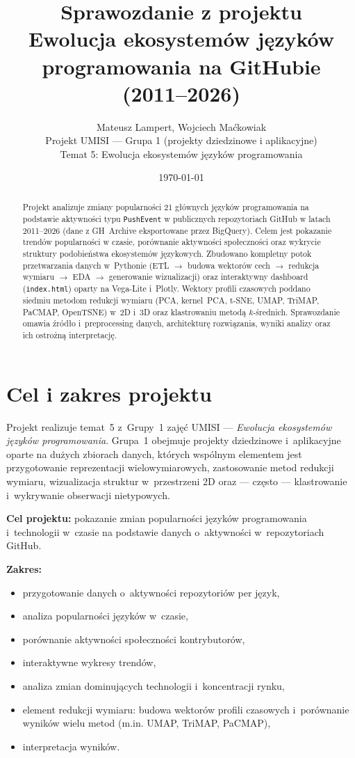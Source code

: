 \documentclass[11pt,a4paper]{article}
\title{\textbf{Sprawozdanie z projektu}\\[0.4em]
\large Ewolucja ekosystemów języków programowania na GitHubie (2011--2026)}
\author{Mateusz Lampert, Wojciech Maćkowiak\\[0.4em]
Projekt UMISI --- Grupa 1 (projekty dziedzinowe i aplikacyjne)\\
Temat 5: Ewolucja ekosystemów języków programowania}
\date{\today}
\begin{document}
\maketitle

\begin{abstract}
\noindent
Projekt analizuje zmiany popularności 21 głównych języków programowania na podstawie
aktywności typu \texttt{PushEvent} w publicznych repozytoriach GitHub w latach
2011--2026 (dane z GH~Archive eksportowane przez BigQuery). Celem jest pokazanie
trendów popularności w czasie, porównanie aktywności społeczności oraz wykrycie
struktury podobieństwa ekosystemów językowych. Zbudowano kompletny potok przetwarzania
danych w~Pythonie (ETL $\rightarrow$ budowa wektorów cech $\rightarrow$ redukcja wymiaru
$\rightarrow$ EDA $\rightarrow$ generowanie wizualizacji) oraz interaktywny dashboard
(\texttt{index.html}) oparty na Vega-Lite i~Plotly. Wektory profili czasowych poddano
siedmiu metodom redukcji wymiaru (PCA, kernel~PCA, t-SNE, UMAP, TriMAP, PaCMAP, OpenTSNE)
w~2D i~3D oraz klastrowaniu metodą $k$-średnich. Sprawozdanie omawia źródło i~preprocessing
danych, architekturę rozwiązania, wyniki analizy oraz ich ostrożną interpretację.
\end{abstract}

\tableofcontents
\newpage

\section{Cel i zakres projektu}

Projekt realizuje temat~5 z~Grupy~1 zajęć UMISI --- \emph{Ewolucja ekosystemów języków
programowania}. Grupa~1 obejmuje projekty dziedzinowe i~aplikacyjne oparte na dużych
zbiorach danych, których wspólnym elementem jest przygotowanie reprezentacji
wielowymiarowych, zastosowanie metod redukcji wymiaru, wizualizacja struktur w~przestrzeni
2D oraz --- często --- klastrowanie i~wykrywanie obserwacji nietypowych.

\textbf{Cel projektu:} pokazanie zmian popularności języków programowania i~technologii
w~czasie na podstawie danych o~aktywności w~repozytoriach GitHub.

\textbf{Zakres:}
\begin{itemize}[nosep]
  \item przygotowanie danych o~aktywności repozytoriów per język,
  \item analiza popularności języków w~czasie,
  \item porównanie aktywności społeczności kontrybutorów,
  \item interaktywne wykresy trendów,
  \item analiza zmian dominujących technologii i~koncentracji rynku,
  \item element redukcji wymiaru: budowa wektorów profili czasowych i~porównanie wyników
        wielu metod (m.in. UMAP, TriMAP, PaCMAP),
  \item interpretacja wyników.
\end{itemize}
\end{document}

